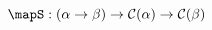\documentclass[preview]{standalone}
\begin{document}
\begin{equation*}
  \mapS : (\alpha \rightarrow \beta) \rightarrow \mathcal{C}(\alpha) \rightarrow \mathcal{C}(\beta)
\end{equation*}
\end{document}

